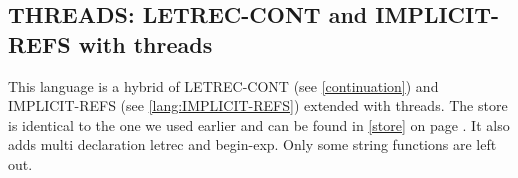 \documentclass[../codeprint.tex]{subfiles}
\begin{document}
\subsection{THREADS: LETREC-CONT and IMPLICIT-REFS with threads}
This language is a hybrid of LETREC-CONT (see \autoref{continuation}) and IMPLICIT-REFS (see \autoref{lang:IMPLICIT-REFS}) extended with threads. The store is identical to the one we used earlier and can be found in \autoref{store} on page \pageref{store}. It also adds multi declaration letrec and begin-exp. Only some string functions are left out.


\end{document}
